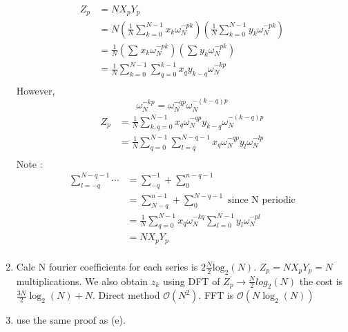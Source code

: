 \begin{enumerate}[label={(\alph*)}]
\begin{align*}
            Z_p &= NX_pY_p \\ 
             &= N\left( \frac{ 1 }{ N } \sum_{k=0}^{N-1} x_k\omega _{ N }^{ -pk }  \right)
             \left( \frac{ 1 }{ N } \sum_{k=0}^{N-1} y_k \omega _{ N }^{ -pk } \right) \\ 
         &= \frac{ 1 }{ N } \left( \sum_{}^{} x_k\omega _{ N }^{ -pk } \right) \left(
         \sum_{}^{} y_k\omega _{ N }^{ -pk } \right)  \\ 
         &= \frac{ 1 }{ N } \sum_{k=0}^{N-1} \sum_{q=0}^{k-1} x_qy_{k-q}\omega_N^{-kp}  \\ 
        \end{align*}
        However, 
        \[
            \omega _{ N }^{ -kp } = \omega _{ N }^{ -qp } \omega _{ N }^{ -(k-q)p } 
        \]
       \begin{align*}
           Z_p &= \frac{ 1 }{ N } \sum_{k,q=0}^{N-1} x_q\omega _{ N }^{ -qp } y _{ k-q}
           \omega _{ N }^{ -(k-q)p } \\ 
            &=  \frac{ 1 }{ N } \sum_{q=0}^{N-1} \sum_{l=q}^{N-q-1} x_q\omega _{ N }^{ -qp
            } y_l \omega _{ N }^{ -lp } \\ 
       \end{align*}
       Note : 
       \begin{align*}
           \sum_{l=-q}^{N-q-1} \cdots  &= \sum_{-q}^{-1} + \sum_{0}^{n-q-1}  \\ 
            &= \sum_{N-q}^{n-1} + \sum_{0}^{N-q-1}  \text{ since N periodic}  \\ 
             &= \frac{ 1 }{ N } \sum_{q=0}^{N-1} x_q \omega _{ N }^{ -kq }
             \sum_{l=0}^{N-1} y_l \omega _{ N }^{ -pl } \\
              &= NX_pY_p \\ 
       \end{align*} 
   \item Calc N fourier coefficients for each series is $ 2 \frac{ N }{ 2 }
       \text{log}_2\left( N\right)  $. 
       $ Z_p = NX_pY_p = N $ multiplications. 
       We also obtain $ z_k $ using DFT of $ Z_p \to \frac{ N }{ 2 } log_2(N)  $ the cost
       is $ \frac{ 3N }{ 2 } \log_2(N) + N  $. Direct method $ \mathcal{ O  } (N^2) $. FFT
       is $ \mathcal{ O  } \left( N\log_2(N)\right)  $
   \item use the same proof as (e). 
\end{enumerate}

